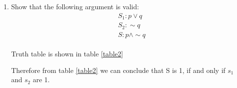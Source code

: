 \documentclass[journal,12pt,twocolumn]{IEEEtran}
\renewcommand\thesection{\arabic{section}}
\begin{document}
\begin{enumerate}[label=\thesection.\arabic*.,ref=\thesection.\theenumi]
\item Show that the following argument is valid:
 \begin{align}
    & S_1 : p \vee q \nonumber \\
    & S_2 : \sim q \nonumber\\
    & S : p \wedge \sim q \nonumber
 \end{align}
 \solution\\
Truth table is shown in table \ref{table2} \\
\begin{table}[htb]
\tiny
 \caption{}
 \label{table2}
 \end{table}
 Therefore from table \ref{table2} we can conclude that S is 1, if and only if $s_1$ and $s_2$ are 1.                                                                     
 \end{enumerate}
\end{document}
